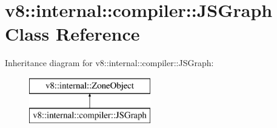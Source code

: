 \hypertarget{classv8_1_1internal_1_1compiler_1_1_j_s_graph}{}\section{v8\+:\+:internal\+:\+:compiler\+:\+:J\+S\+Graph Class Reference}
\label{classv8_1_1internal_1_1compiler_1_1_j_s_graph}
Inheritance diagram for v8\+:\+:internal\+:\+:compiler\+:\+:J\+S\+Graph\+:\begin{figure}[H]
\begin{center}
\leavevmode
\includegraphics[height=2.000000cm]{classv8_1_1internal_1_1compiler_1_1_j_s_graph}
\end{center}
\end{figure}
